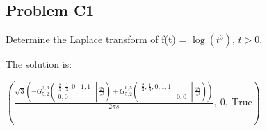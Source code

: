 \subsection{Problem C1} Determine the Laplace transform of f(t) = \(\log{\left(t^{3} \right)}\), \(t > 0\).

    \medskip
    The solution is:
    
    \smallskip
     \(\left( \frac{\sqrt{3} \left(- {G_{5, 2}^{2, 3}\left(\begin{matrix} \frac{2}{3}, \frac{1}{3}, 0 & 1, 1 \\0, 0 &  \end{matrix} \middle| {\frac{27}{s^{3}}} \right)} + {G_{5, 2}^{0, 5}\left(\begin{matrix} \frac{2}{3}, \frac{1}{3}, 0, 1, 1 &  \\ & 0, 0 \end{matrix} \middle| {\frac{27}{s^{3}}} \right)}\right)}{2 \pi s}, \  0, \  \text{True}\right)\)